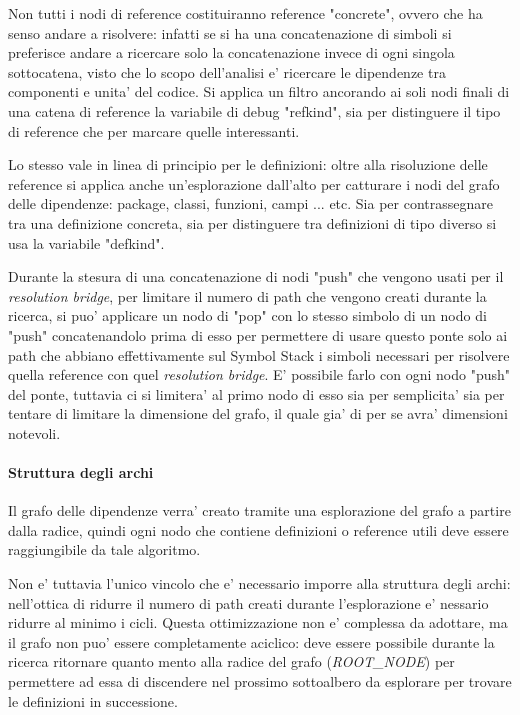 \par
Non tutti i nodi di reference costituiranno reference "concrete", ovvero che ha senso andare a risolvere: infatti se si ha una concatenazione di simboli si preferisce andare a ricercare solo la concatenazione invece di ogni singola sottocatena, visto che lo scopo dell'analisi e' ricercare le dipendenze tra componenti e unita' del codice. Si applica un filtro ancorando ai soli nodi finali di una catena di reference la variabile di debug "refkind", sia per distinguere il tipo di reference che per marcare quelle interessanti.

\par
Lo stesso vale in linea di principio per le definizioni: oltre alla risoluzione delle reference si applica anche un'esplorazione dall'alto per catturare i nodi del grafo delle dipendenze: package, classi, funzioni, campi ... etc. Sia per contrassegnare tra una definizione concreta, sia per distinguere tra definizioni di tipo diverso si usa la variabile "defkind".

\par
Durante la stesura di una concatenazione di nodi "push" che vengono usati per il \emph{resolution bridge}, per limitare il numero di path che vengono creati durante la ricerca, si puo' applicare un nodo di "pop" con lo stesso simbolo di un nodo di "push" concatenandolo prima di esso per permettere di usare questo ponte solo ai path che abbiano effettivamente sul Symbol Stack i simboli necessari per risolvere quella reference con quel \emph{resolution bridge}.
E' possibile farlo con ogni nodo "push" del ponte, tuttavia ci si limitera' al primo nodo di esso sia per semplicita' sia per tentare di limitare la dimensione del grafo, il quale gia' di per se avra' dimensioni notevoli.

\paragraph{Struttura degli archi}

Il grafo delle dipendenze verra' creato tramite una esplorazione del grafo a partire dalla radice, quindi ogni nodo che contiene definizioni o reference utili deve essere raggiungibile da tale algoritmo.

\par
Non e' tuttavia l'unico vincolo che e' necessario imporre alla struttura degli archi: nell'ottica di ridurre il numero di path creati durante l'esplorazione e' nessario ridurre al minimo i cicli.
Questa ottimizzazione non e' complessa da adottare, ma il grafo non puo' essere completamente aciclico: deve essere possibile durante la ricerca ritornare quanto mento alla radice del grafo (\emph{ROOT\_NODE}) per permettere ad essa di discendere nel prossimo sottoalbero da esplorare per trovare le definizioni in successione.

